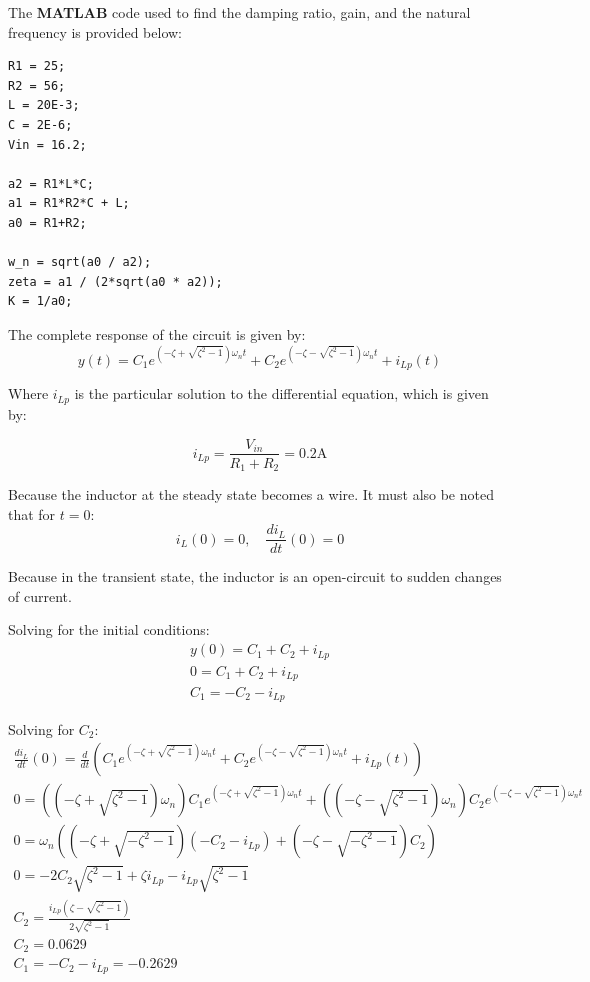 The {\bf MATLAB} code used to find the damping ratio, gain, and the natural frequency is provided below:

\begin{verbatim}
R1 = 25;
R2 = 56;
L = 20E-3;
C = 2E-6;
Vin = 16.2;

a2 = R1*L*C;
a1 = R1*R2*C + L;
a0 = R1+R2;

w_n = sqrt(a0 / a2);
zeta = a1 / (2*sqrt(a0 * a2));
K = 1/a0;
\end{verbatim}

The complete response of the circuit is given by:
\begin{equation}
    y(t) = C_1e^{\left(-\zeta + \sqrt{\zeta^2 - 1}\right)\omega_n t} + C_2e^{\left(-\zeta - \sqrt{\zeta^2 - 1}\right)\omega_n t} + i_{Lp}(t)
\end{equation}

Where $i_{Lp}$ is the particular solution to the differential equation, which is given by:

\begin{equation}
    i_{Lp} = \frac{V_{in}}{R_1+R_2} = 0.2\text{A}
\end{equation}

Because the inductor at the steady state becomes a wire.
It must also be noted that for $t=0$:
\begin{equation}
    i_L(0) = 0, \quad \frac{di_L}{dt}(0) = 0
\end{equation}

Because in the transient state, the inductor is an open-circuit to sudden changes of current.

Solving for the initial conditions:
\begin{equation}
    \begin{gathered}
        y(0) = C_1 + C_2 + i_{Lp} \\
        0 = C_1 + C_2 + i_{Lp} \\
        C_1 = -C_2 - i_{Lp}
    \end{gathered}
\end{equation}

Solving for $C_2$:
\begin{equation}
    \begin{gathered}
        \frac{di_L}{dt}(0) = \frac{d}{dt}(C_1e^{\left(-\zeta + \sqrt{\zeta^2 - 1}\right)\omega_n t} + C_2e^{\left(-\zeta - \sqrt{\zeta^2 - 1}\right)\omega_n t} + i_{Lp}(t)) \\
        0 = ((-\zeta + \sqrt{\zeta^2 - 1})\omega_n)C_1e^{\left(-\zeta + \sqrt{\zeta^2 - 1}\right)\omega_n t} + ((-\zeta - \sqrt{\zeta^2 - 1})\omega_n)C_2e^{(-\zeta - \sqrt{\zeta^2 - 1})\omega_n t} \\
        0 = \omega_n\left((-\zeta + \sqrt{-\zeta^2 - 1})(-C_2 - i_{Lp}) + (-\zeta - \sqrt{-\zeta^2 - 1})C_2\right) \\
        0 = -2C_2\sqrt{\zeta^2 - 1} + \zeta i_{Lp} - i_{Lp} \sqrt{\zeta^2 -1} \\
        C_2 = \frac{i_{Lp}(\zeta - \sqrt{\zeta^2 - 1})}{2\sqrt{\zeta^2 - 1}} \\
        C_2 = 0.0629 \\
        C_1 = -C_2 - i_{Lp} = -0.2629
    \end{gathered}
\end{equation}

